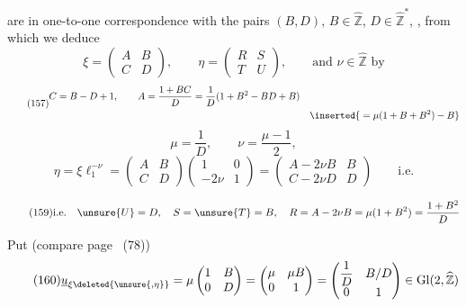are in one-to-one correspondence with the pairs $(B,D)$, $B\in\widehat{\mathbb Z}$, $D\in\widehat{\mathbb Z}^{*}$, , from which we deduce
\[
\xi=\begin{pmatrix}A&B\\C&D\end{pmatrix},\qquad
\eta=\begin{pmatrix}R&S\\T&U\end{pmatrix},\qquad
\text{and }\nu\in\widehat{\mathbb Z}\text{ by}
\]
\[
\tag{157}
\begin{aligned}
C&=B-D+1,\qquad
A=\frac{1+BC}{D}=\frac1D(1+B^2-BD+B)\\
&&\inserted{{}=\mu(1+B+B^2)-B}
\end{aligned}
\]
\[
\tag{158}
\mu=\frac1D,\qquad\nu=\frac{\mu-1}{2},
\]
\[
\eta=\xi\ell_1^{-\nu}
=\begin{pmatrix}A&B\\C&D\end{pmatrix}
\begin{pmatrix}1&0\\-2\nu&1\end{pmatrix}
=\begin{pmatrix}A-2\nu B&B\\C-2\nu D&D\end{pmatrix}
\qquad\text{i.e.}
\]


\[
\tag{159}
\text{i.e.}\quad
\unsure{U}=D,\quad S=\unsure{T}=B,\quad
R=A-2\nu B=\mu(1+B^2)=\frac{1+B^2}{D}
\]

Put (compare page~ (78))
\[
\tag{160}
\underline u_{\xi\deleted{\unsure{,\eta}}}
=\mu\begin{pmatrix}1&B\\0&D\end{pmatrix}
=\begin{pmatrix}\mu&\mu B\\0&1\end{pmatrix}
=\begin{pmatrix}\dfrac1D&B/D\\0&1\end{pmatrix}
\in\mathrm{Gl}(2,\widehat{\mathbb Z})
\]


